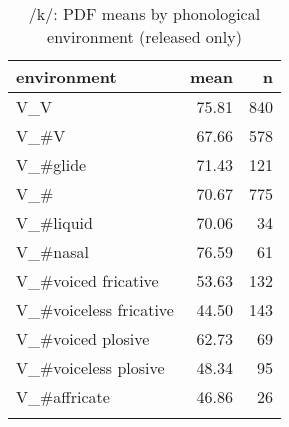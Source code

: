 \begin{table}[b]
	
	\caption{/k/: PDF means by phonological environment (released only)}
	\label{tab.k.mean.environment}
	\begin{tabular}{lrr}
		\lsptoprule
		environment & mean \isi{PDF} & n\\
		\midrule
		V\_V & 75.81 & 840\\
		V\_\#V & 67.66 & 578\\
		V\_\#glide & 71.43 & 121\\
		V\_\# & 70.67 & 775\\
		V\_\#liquid & 70.06 & 34\\
		V\_\#nasal & 76.59 & 61\\
		V\_\#voiced fricative & 53.63 & 132\\
		V\_\#voiceless fricative & 44.50 & 143\\
		V\_\#voiced plosive & 62.73 & 69\\
		V\_\#voiceless plosive & 48.34 & 95\\
		V\_\#affricate & 46.86 & 26\\
		\lspbottomrule
	\end{tabular}
\end{table}

